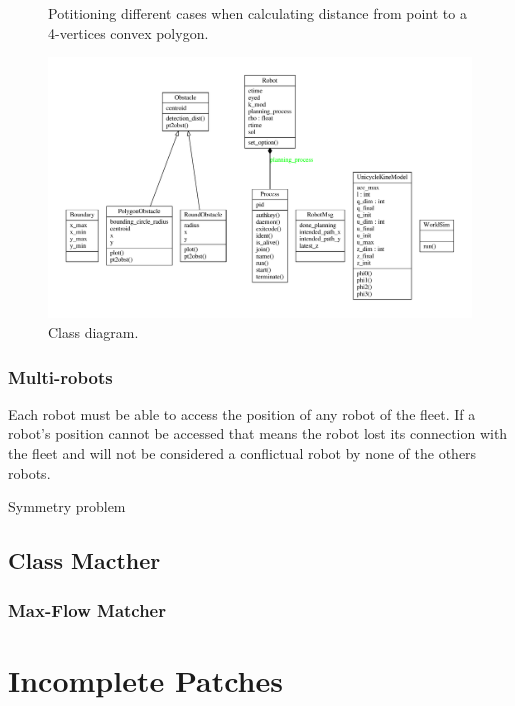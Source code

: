 \begin{figure}[!h]
{}
\caption{Potitioning different cases when calculating distance from point to a 4-vertices convex polygon. \label{fig:convexpolygon}}
\end{figure}

\begin{figure}[!h]
	\centering
	\includegraphics[width=1.\textwidth]{./img/classes_planning.pdf}
	\caption{Class diagram.\label{fig:classesdiagram}}
\end{figure}


\subsection{Multi-robots}

Each robot must be able to access the position of any robot of the fleet. If a robot's position cannot be accessed that means the robot lost its connection with the fleet and will not be considered a conflictual robot by none of the others robots.


Symmetry problem 

\newpage

\section{Class Macther}
\lipsum[1-2]
\subsection{Max-Flow Matcher}
\lipsum[1-3]

\chapter{Incomplete Patches}
\lipsum[1-10]